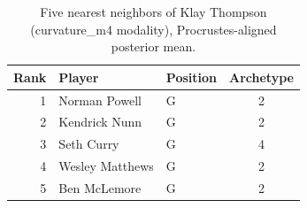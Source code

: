 \begin{table}[htbp]
  \centering\small
  \begin{tabular}{rllc}
    \toprule
    Rank & Player & Position & Archetype \\
    \midrule
    1 & Norman Powell & G & 2 \\
    2 & Kendrick Nunn & G & 2 \\
    3 & Seth Curry & G & 4 \\
    4 & Wesley Matthews & G & 2 \\
    5 & Ben McLemore & G & 2 \\
    \bottomrule
  \end{tabular}
  \caption{Five nearest neighbors of Klay Thompson (curvature_m4 modality), Procrustes-aligned posterior mean.}
  \label{tab:Klay_Thompson_neighbors_curvature_m4}
\end{table}


